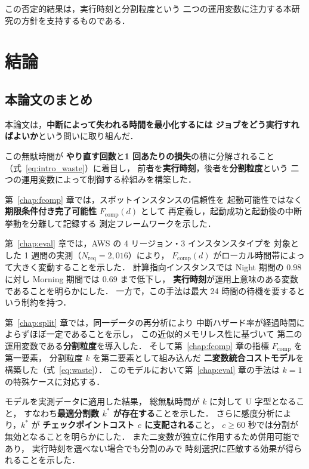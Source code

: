 \documentclass[11pt,a4paper]{ltjsreport}
\newcommand{\Fcomp}{F_{\mathrm{comp}}}
\newcommand{\Nreq}{N_{\mathrm{req}}}
\begin{document}
この否定的結果は，実行時刻と分割粒度という
二つの運用変数に注力する本研究の方針を支持するものである．

\chapter{結論}
\label{chap:conclusion}

\section{本論文のまとめ}

本論文は，\textbf{中断によって失われる時間を最小化するには
ジョブをどう実行すればよいか}という問いに取り組んだ．

この無駄時間が
\textbf{やり直す回数}と\textbf{1 回あたりの損失}の積に分解されること
（式~\eqref{eq:intro_waste}）に着目し，
前者を\textbf{実行時刻}，後者を\textbf{分割粒度}という
二つの運用変数によって制御する枠組みを構築した．

第~\ref{chap:fcomp} 章では，スポットインスタンスの信頼性を
起動可能性ではなく\textbf{期限条件付き完了可能性} $\Fcomp(d)$ として
再定義し，起動成功と起動後の中断挙動を分離して記録する
測定フレームワークを示した．

第~\ref{chap:eval} 章では，AWS の 4 リージョン・3 インスタンスタイプを
対象とした 1 週間の実測（$\Nreq = 2{,}016$）により，
$\Fcomp(d)$ がローカル時間帯によって大きく変動することを示した．
計算指向インスタンスでは Night 期間の $0.98$ に対し
Morning 期間では $0.69$ まで低下し，
\textbf{実行時刻}が運用上意味のある変数であることを明らかにした．
一方で，この手法は最大 24 時間の待機を要するという制約を持つ．

第~\ref{chap:split} 章では，同一データの再分析により
中断ハザード率が経過時間によらずほぼ一定であることを示し，
この近似的メモリレス性に基づいて
第二の運用変数である\textbf{分割粒度}を導入した．
そして第~\ref{chap:fcomp} 章の指標 $\Fcomp$ を第一要素，
分割粒度 $k$ を第二要素として組み込んだ
\textbf{二変数統合コストモデル}を構築した（式~\eqref{eq:waste}）．
このモデルにおいて第~\ref{chap:eval} 章の手法は $k=1$ の特殊ケースに対応する．

モデルを実測データに適用した結果，
総無駄時間が $k$ に対して U 字型となること，
すなわち\textbf{最適分割数 $k^{*}$ が存在する}ことを示した．
さらに感度分析により，$k^{*}$ が
\textbf{チェックポイントコスト $c$ に支配される}こと，
$c \geq 60$ 秒では分割が無効となることを明らかにした．
また二変数が独立に作用するため併用可能であり，
実行時刻を選べない場合でも分割のみで
時刻選択に匹敵する効果が得られることを示した．
\end{document}

